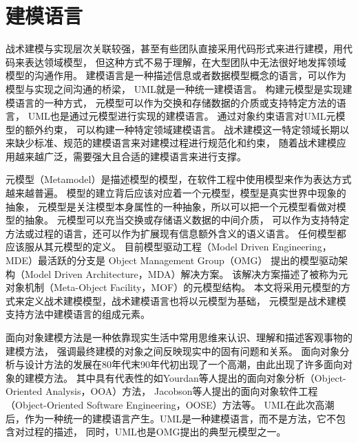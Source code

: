 \section{建模语言}

战术建模与实现层次关联较强，甚至有些团队直接采用代码形式来进行建模，用代码来表达领域模型，
但这种方式不易于理解，在大型团队中无法很好地发挥领域模型的沟通作用。
建模语言是一种描述信息或者数据模型概念的语言，可以作为模型与实现之间沟通的桥梁，
UML就是一种统一建模语言。
构建元模型是实现建模语言的一种方式，
元模型可以作为交换和存储数据的介质或支持特定方法的语言，
UML也是通过元模型进行实现的建模语言。
通过对象约束语言对UML元模型的额外约束，
可以构建一种特定领域建模语言。
战术建模这一特定领域长期以来缺少标准、规范的建模语言来对建模过程进行规范化和约束，
随着战术建模应用越来越广泛，需要强大且合适的建模语言来进行支撑。

元模型（Metamodel）是描述模型的模型，在软件工程中使用模型来作为表达方式越来越普遍。
模型的建立背后应该对应着一个元模型，模型是真实世界中现象的抽象，
元模型是关注模型本身属性的一种抽象，所以可以把一个元模型看做对模型的抽象。
元模型可以充当交换或存储语义数据的中间介质，
可以作为支持特定方法或过程的语言，还可以作为扩展现有信息额外含义的语义语言\cite{emerson2006techniques}。
任何模型都应该服从其元模型的定义。
目前模型驱动工程（Model Driven Engineering，MDE）最活跃的分支是
Object Management Group（OMG）\footnotemark[2]
提出的模型驱动架构（Model Driven Architecture，MDA）解决方案\cite{soley2000model}。
该解决方案描述了被称为元对象机制（Meta-Object Facility，MOF）的元模型结构。
本文将采用元模型的方式来定义战术建模模型，战术建模语言也将以元模型为基础，
元模型是战术建模支持方法中建模语言的组成元素。


面向对象建模方法是一种依靠现实生活中常用思维来认识、理解和描述客观事物的建模方法，
强调最终建模的对象之间反映现实中的固有问题和关系。
面向对象分析与设计方法的发展在80年代末90年代初出现了一个高潮，由此出现了许多面向对象的建模方法。
其中具有代表性的如Yourdan等人\cite{coad1991object}提出的面向对象分析（Object-Oriented Analysis，OOA）方法，
Jacobson等人\cite{jacobson1995use}提出的面向对象软件工程（Object-Oriented Software Engineering，OOSE）方法等。
UML在此次高潮后，作为一种统一的建模语言产生。UML是一种建模语言，而不是方法，它不包含对过程的描述，
同时，UML也是OMG提出的典型元模型之一。

